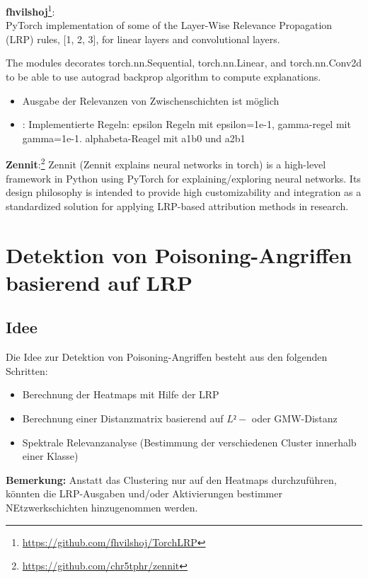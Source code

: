 \documentclass{article}
\theoremstyle{break}
\begin{document}
	\noindent \textbf{fhvilshoj}\footnote{\url{https://github.com/fhvilshoj/TorchLRP}}:\\
	
	
	
	\noindent PyTorch implementation of some of the Layer-Wise Relevance Propagation (LRP) rules, [1, 2, 3], for linear layers and convolutional layers.
	
	The modules decorates torch.nn.Sequential, torch.nn.Linear, and torch.nn.Conv2d to be able to use autograd backprop algorithm to compute explanations.
	\begin{itemize}
		\item Ausgabe der Relevanzen von Zwischenschichten ist möglich
		\item: Implementierte Regeln: epsilon Regeln mit epsilon=1e-1, gamma-regel mit gamma=1e-1. alphabeta-Reagel mit a1b0 und a2b1
	\end{itemize}
	

	
	\noindent \textbf{Zennit}:\footnote{\url{https://github.com/chr5tphr/zennit}}
	Zennit (Zennit explains neural networks in torch) is a high-level framework in Python using PyTorch for explaining/exploring neural networks. Its design philosophy is intended to provide high customizability and integration as a standardized solution for applying LRP-based attribution methods in research.
	\section{Detektion von Poisoning-Angriffen basierend auf LRP}
	\subsection{Idee}
	Die Idee zur Detektion von Poisoning-Angriffen besteht aus den folgenden Schritten:
	
	\begin{itemize}
		\item Berechnung der Heatmaps mit Hilfe der LRP
		\item Berechnung einer Distanzmatrix basierend auf $L²-$ oder GMW-Distanz
		\item Spektrale Relevanzanalyse (Bestimmung der verschiedenen Cluster innerhalb einer Klasse)
	\end{itemize}

	\noindent  \textbf{Bemerkung:} Anstatt das Clustering nur auf den Heatmaps durchzuführen, könnten die LRP-Ausgaben und/oder Aktivierungen bestimmer NEtzwerkschichten hinzugenommen werden.
\end{document}

